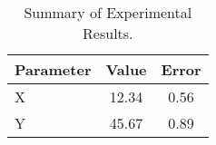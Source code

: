 \begin{table}[H]
\centering
\caption{Summary of Experimental Results.}
\begin{floatrow}
\begin{tabular}{lcc}
\toprule
\textbf{Parameter} & \textbf{Value} & \textbf{Error} \\ \midrule
X                  & 12.34          & 0.56           \\
Y                  & 45.67          & 0.89           \\
\bottomrule
\end{tabular}
\end{floatrow}
\label{tab:results}
\end{table}
